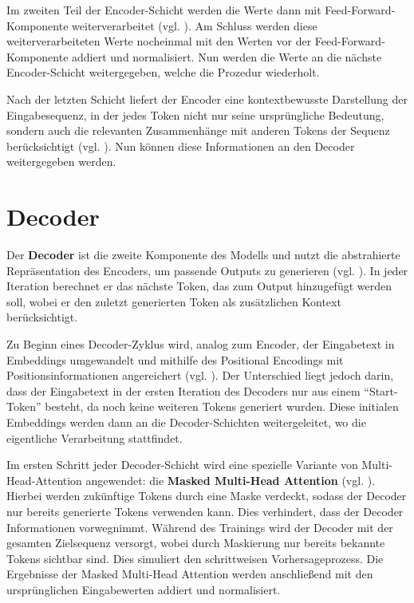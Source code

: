 Im zweiten Teil der Encoder-Schicht werden die Werte dann mit Feed-Forward-Komponente weiterverarbeitet (vgl. \cite[S. 3]{attention}).
Am Schluss werden diese weiterverarbeiteten Werte nocheinmal mit den Werten vor der Feed-Forward-Komponente addiert und normalisiert. 
Nun werden die Werte an die nächste Encoder-Schicht weitergegeben, welche die Prozedur wiederholt.

Nach der letzten Schicht liefert der Encoder eine kontextbewusste Darstellung der Eingabesequenz, in der jedes Token nicht nur seine ursprüngliche Bedeutung, sondern auch die relevanten Zusammenhänge mit anderen Tokens der Sequenz berücksichtigt (vgl. \cite[S. 3]{attention}).
Nun können diese Informationen an den Decoder weitergegeben werden.

\section{Decoder}

Der \textbf{Decoder} ist die zweite Komponente des Modells und nutzt die abstrahierte Repräsentation des Encoders, um passende Outputs zu generieren (vgl. \cite[S. 3]{attention}). 
In jeder Iteration berechnet er das nächste Token, das zum Output hinzugefügt werden soll, wobei er den zuletzt generierten Token als zusätzlichen Kontext berücksichtigt.

Zu Beginn eines Decoder-Zyklus wird, analog zum Encoder, der Eingabetext in Embeddings umgewandelt und mithilfe des Positional Encodings mit Positionsinformationen angereichert  (vgl. \cite[S. 213]{paass.2020}). 
Der Unterschied liegt jedoch darin, dass der Eingabetext in der ersten Iteration des Decoders nur aus einem \enquote{Start-Token} besteht, da noch keine weiteren Tokens generiert wurden. 
Diese initialen Embeddings werden dann an die Decoder-Schichten weitergeleitet, wo die eigentliche Verarbeitung stattfindet.

Im ersten Schritt jeder Decoder-Schicht wird eine spezielle Variante von Multi-Head-Attention angewendet: die \textbf{Masked Multi-Head Attention} (vgl. \cite[S. 213]{paass.2020}). 
Hierbei werden zukünftige Tokens durch eine Maske verdeckt, sodass der Decoder nur bereits generierte Tokens verwenden kann. 
Dies verhindert, dass der Decoder Informationen vorwegnimmt.  
Während des Trainings wird der Decoder mit der gesamten Zielsequenz versorgt, wobei durch Maskierung nur bereits bekannte Tokens sichtbar sind. 
Dies simuliert den schrittweisen Vorhersageprozess.  
Die Ergebnisse der Masked Multi-Head Attention werden anschließend mit den ursprünglichen Eingabewerten addiert und normalisiert.

